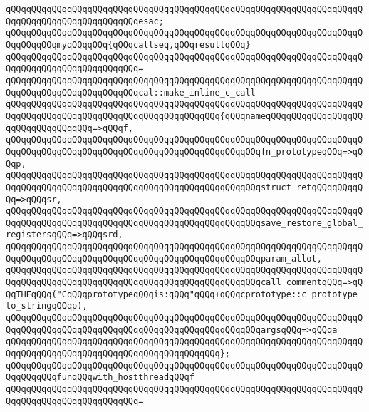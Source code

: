 \verb|qQQqqQQqqQQqqQQqqQQqqQQqqQQqqQQqqQQqqQQqqQQqqQQqqQQqqQQqqQQqqQQqqQQqqQQqqQQqqQQqqQQqqQQqqQQqqQQqesac;|\newline
\newline
\verb|qQQqqQQqqQQqqQQqqQQqqQQqqQQqqQQqqQQqqQQqqQQqqQQqqQQqqQQqqQQqqQQqqQQqqQQqqQQqqQQqmyqQQqqQQq{qQQqcallseq,qQQqresultqQQq}|\newline
\verb|qQQqqQQqqQQqqQQqqQQqqQQqqQQqqQQqqQQqqQQqqQQqqQQqqQQqqQQqqQQqqQQqqQQqqQQqqQQqqQQqqQQqqQQqqQQqqQQq=|\newline
\verb|qQQqqQQqqQQqqQQqqQQqqQQqqQQqqQQqqQQqqQQqqQQqqQQqqQQqqQQqqQQqqQQqqQQqqQQqqQQqqQQqqQQqqQQqqQQqqQQqcal::make_inline_c_call|\newline
\verb|qQQqqQQqqQQqqQQqqQQqqQQqqQQqqQQqqQQqqQQqqQQqqQQqqQQqqQQqqQQqqQQqqQQqqQQqqQQqqQQqqQQqqQQqqQQqqQQqqQQqqQQqqQQqqQQq{qQQqnameqQQqqQQqqQQqqQQqqQQqqQQqqQQqqQQqqQQq=>qQQqf,|\newline
\verb|qQQqqQQqqQQqqQQqqQQqqQQqqQQqqQQqqQQqqQQqqQQqqQQqqQQqqQQqqQQqqQQqqQQqqQQqqQQqqQQqqQQqqQQqqQQqqQQqqQQqqQQqqQQqqQQqqQQqqQQqfn_prototypeqQQq=>qQQqp,|\newline
\verb|qQQqqQQqqQQqqQQqqQQqqQQqqQQqqQQqqQQqqQQqqQQqqQQqqQQqqQQqqQQqqQQqqQQqqQQqqQQqqQQqqQQqqQQqqQQqqQQqqQQqqQQqqQQqqQQqqQQqqQQqstruct_retqQQqqQQqqQQq=>qQQqsr,|\newline
\verb|qQQqqQQqqQQqqQQqqQQqqQQqqQQqqQQqqQQqqQQqqQQqqQQqqQQqqQQqqQQqqQQqqQQqqQQqqQQqqQQqqQQqqQQqqQQqqQQqqQQqqQQqqQQqqQQqqQQqqQQqsave_restore_global_registersqQQq=>qQQqsrd,|\newline
\verb|qQQqqQQqqQQqqQQqqQQqqQQqqQQqqQQqqQQqqQQqqQQqqQQqqQQqqQQqqQQqqQQqqQQqqQQqqQQqqQQqqQQqqQQqqQQqqQQqqQQqqQQqqQQqqQQqqQQqqQQqparam_allot,|\newline
\verb|qQQqqQQqqQQqqQQqqQQqqQQqqQQqqQQqqQQqqQQqqQQqqQQqqQQqqQQqqQQqqQQqqQQqqQQqqQQqqQQqqQQqqQQqqQQqqQQqqQQqqQQqqQQqqQQqqQQqqQQqcall_commentqQQq=>qQQqTHEqQQq("CqQQqprototypeqQQqis:qQQq"qQQq+qQQqcprototype::c_prototype_to_stringqQQqp),|\newline
\verb|qQQqqQQqqQQqqQQqqQQqqQQqqQQqqQQqqQQqqQQqqQQqqQQqqQQqqQQqqQQqqQQqqQQqqQQqqQQqqQQqqQQqqQQqqQQqqQQqqQQqqQQqqQQqqQQqqQQqqQQqargsqQQq=>qQQqa|\newline
\verb|qQQqqQQqqQQqqQQqqQQqqQQqqQQqqQQqqQQqqQQqqQQqqQQqqQQqqQQqqQQqqQQqqQQqqQQqqQQqqQQqqQQqqQQqqQQqqQQqqQQqqQQqqQQqqQQq};|\newline
\newline
\verb|qQQqqQQqqQQqqQQqqQQqqQQqqQQqqQQqqQQqqQQqqQQqqQQqqQQqqQQqqQQqqQQqqQQqqQQqqQQqqQQqfunqQQqwith_hostthreadqQQqf|\newline
\verb|qQQqqQQqqQQqqQQqqQQqqQQqqQQqqQQqqQQqqQQqqQQqqQQqqQQqqQQqqQQqqQQqqQQqqQQqqQQqqQQqqQQqqQQqqQQqqQQq=|\newline
